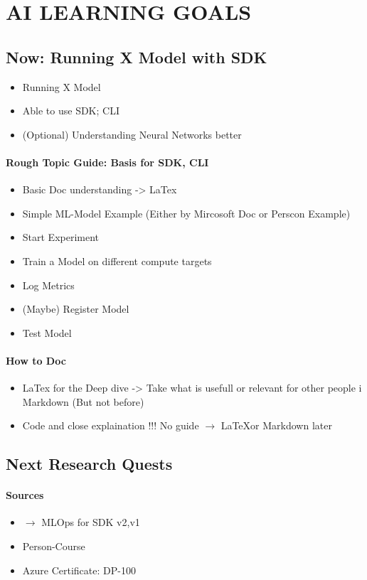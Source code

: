 
\section{AI LEARNING GOALS}

\subsection{Now: Running X Model with SDK}
\begin{itemize}
	\item Running X Model
	\item Able to use SDK; CLI
	\item (Optional) Understanding Neural Networks better
\end{itemize}

\paragraph{Rough Topic Guide: Basis for SDK, CLI}
\begin{itemize}
	\item Basic Doc understanding -> LaTex
	\item Simple ML-Model Example (Either by Mircosoft Doc or Perscon Example)
	\item Start Experiment
	\item Train a Model on different compute targets
	\item Log Metrics
	\item (Maybe) Register Model
	\item Test Model
\end{itemize}



\paragraph{How to Doc}
\begin{itemize}
	\item LaTex for the Deep dive -> Take what is usefull or relevant for other people i Markdown (But not before)
	\item Code and close explaination !!! No guide $\rightarrow$ \LaTeX or Markdown later
\end{itemize}


\subsection{Next Research Quests}
\paragraph{Sources}
\begin{itemize}
	\item $\rightarrow$ MLOps for SDK v2,v1
	\item Person-Course
	\item Azure Certificate: DP-100
\end{itemize}

